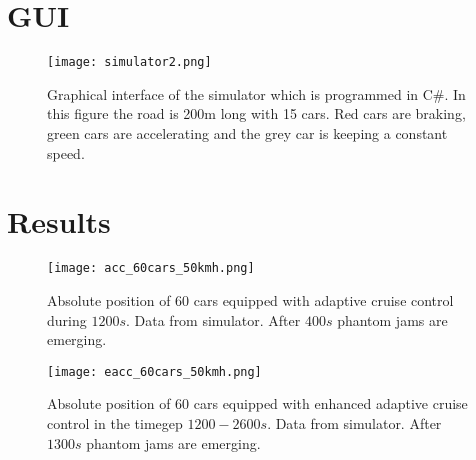 \section{GUI}
\label{gui}

\begin{figure}[H]
    \begin{center}
    \texttt{[image: simulator2.png]}
    \caption{Graphical interface of the simulator which is programmed in C\#. In this figure the road is 200m long with 15 cars. Red cars are braking, green cars are accelerating and the grey car is keeping a constant speed.}
    \end{center}
\end{figure}

\section{Results}
\label{app_postime_plot}
\begin{figure}[H]
    \begin{center}
    \texttt{[image: acc\_60cars\_50kmh.png]}
    \caption{\label{acc_postime}
Absolute position of 60 cars equipped with adaptive cruise control during $ 1200 \unit{s} $. Data from simulator. After $ 400 \unit{s} $ phantom jams are emerging.}
    \end{center}
\end{figure}

\begin{figure}[H]
    \begin{center}
    \texttt{[image: eacc\_60cars\_50kmh.png]}
    \caption{\label{eacc_postime}
Absolute position of 60 cars equipped with enhanced adaptive cruise control in the timegep $ 1200 - 2600 \unit{s} $. Data from simulator. After $ 1300 \unit{s} $ phantom jams are emerging.}
    \end{center}
\end{figure}